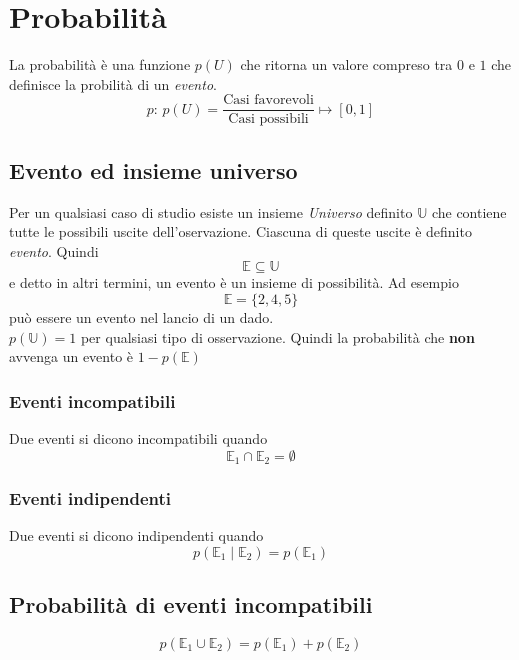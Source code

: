 
\section{Probabilità}\label{sec:prob}
La probabilità è una funzione $p(U)$ che ritorna un valore compreso tra $0$ e $1$ che definisce la 
probilità di un \emph{evento}.
\begin{equation*}
  p:\,p(U) = \frac{\text{Casi favorevoli}}{\text{Casi possibili}}\mapsto {[{0},{1}]}
\end{equation*}

\subsection{Evento ed insieme universo}
Per un qualsiasi caso di studio esiste un insieme \emph{Universo} definito $\mathbb{U}$ che contiene
tutte le possibili uscite dell'oservazione. Ciascuna di queste uscite è definito \emph{evento}.
Quindi
\begin{equation*}
  \mathbb{E} \subseteq \mathbb{U}
\end{equation*}
e detto in altri termini, un evento è un insieme di possibilità. Ad esempio
\begin{equation*}
  \mathbb{E} = \{2,4,5\}
\end{equation*}
può essere un evento nel lancio di un dado.\\
$p(\mathbb{U}) = 1$ per qualsiasi tipo di osservazione. Quindi la probabilità che \textbf{non} avvenga
un evento è $1-p(\mathbb{E})$

\subsubsection{Eventi incompatibili}
Due eventi si dicono incompatibili quando
\begin{equation*}
  \mathbb{E}_1 \cap \mathbb{E}_2 = \emptyset
\end{equation*}

\subsubsection{Eventi indipendenti}
Due eventi si dicono indipendenti quando
\begin{equation*}
  p\left(\mathbb{E}_1\mid\mathbb{E}_2\right) = p(\mathbb{E}_1)
\end{equation*}

\subsection{Probabilità di eventi incompatibili}
\begin{equation*}
  p(\mathbb{E}_1\cup\mathbb{E}_2) = p(\mathbb{E}_1) + p(\mathbb{E}_2)
\end{equation*}

